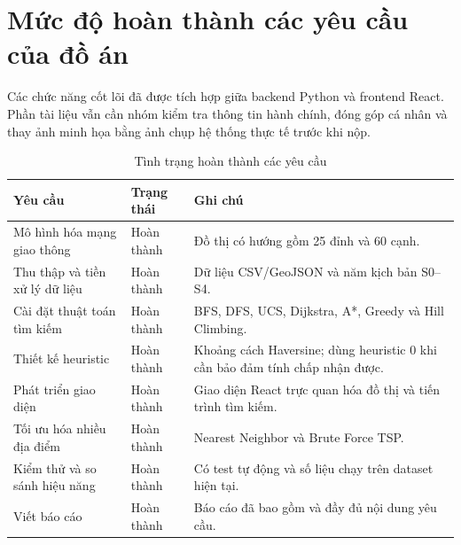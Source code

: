 \section{Mức độ hoàn thành các yêu cầu của đồ án}

Các chức năng cốt lõi đã được tích hợp giữa backend Python và frontend React.
Phần tài liệu vẫn cần nhóm kiểm tra thông tin hành chính, đóng góp cá nhân và
thay ảnh minh họa bằng ảnh chụp hệ thống thực tế trước khi nộp.

\begin{table}[h!]
\centering
\caption{Tình trạng hoàn thành các yêu cầu}
\begin{tabular}{p{6.2cm}p{2.7cm}p{5.2cm}}
\toprule
Yêu cầu & Trạng thái & Ghi chú \\
\midrule
Mô hình hóa mạng giao thông & Hoàn thành & Đồ thị có hướng gồm 25 đỉnh và 60 cạnh. \\
Thu thập và tiền xử lý dữ liệu & Hoàn thành & Dữ liệu CSV/GeoJSON và năm kịch bản S0--S4. \\
Cài đặt thuật toán tìm kiếm & Hoàn thành & BFS, DFS, UCS, Dijkstra, A*, Greedy và Hill Climbing. \\
Thiết kế heuristic & Hoàn thành & Khoảng cách Haversine; dùng heuristic 0 khi cần bảo đảm tính chấp nhận được. \\
Phát triển giao diện & Hoàn thành & Giao diện React trực quan hóa đồ thị và tiến trình tìm kiếm. \\
Tối ưu hóa nhiều địa điểm & Hoàn thành & Nearest Neighbor và Brute Force TSP. \\
Kiểm thử và so sánh hiệu năng & Hoàn thành & Có test tự động và số liệu chạy trên dataset hiện tại. \\
Viết báo cáo & Hoàn thành & Báo cáo đã bao gồm và đầy đủ nội dung yêu cầu. \\
\bottomrule
\end{tabular}
\end{table}
